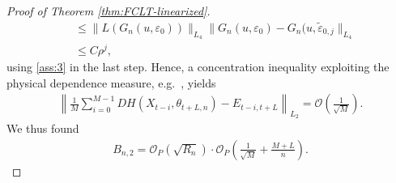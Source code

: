 \documentclass[10pt, a4paper]{article}
\theoremstyle{assumption}
\theoremstyle{definition}
\theoremstyle{theorem}
\begin{document}
\begin{proof}[Proof of Theorem \ref{thm:FCLT-linearized}]
\begin{align*}
        &\leq \|L(G_n(u,\varepsilon_0))\|_{L_4} \| G_n(u,\varepsilon_0) -G_n(u,\tilde{\varepsilon}_{0, j} \|_{L_4} \\
        &\leq C \rho^j,
    \end{align*}
    using \eqref{ass:3} in the last step.
    Hence, a concentration inequality exploiting the physical dependence measure, e.g.\ \cite[Thm.~3.2]{mies_sequential_2023}, yields
    \begin{align*}
        \left\| \frac{1}{M} \sum_{i=0}^{M-1} DH(X_{t-i}, \theta_{t+L,n}) -E_{t-i,t+L}  \right\|_{L_2} = \mathcal{O}(\tfrac{1}{\sqrt{M}}).
    \end{align*}
    We thus found 
    \begin{align*}
        B_{n,2} = \mathcal{O}_P\left(\sqrt{R_n}\right) \cdot \mathcal{O}_P\left( \frac{1}{\sqrt{M}} +\frac{M+L}{n} \right).
    \end{align*}


\end{proof}
\end{document}
